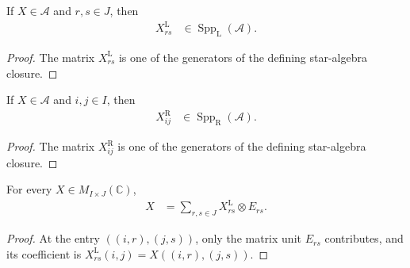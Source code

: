 \begin{lemma}
    \label{thm:qca_left_coefficient_mem_support}
    \leanok
    If $X\in\mathcal A$ and $r,s\in J$, then
    \begin{align}
        X^{\mathrm L}_{rs}
         & \in\operatorname{Spp}_{\mathrm L}(\mathcal A).
    \end{align}
\end{lemma}

\begin{proof}\leanok
    The matrix $X^{\mathrm L}_{rs}$ is one of the generators of the defining
    star-algebra closure.
\end{proof}

\begin{lemma}
    \label{thm:qca_right_coefficient_mem_support}
    \leanok
    If $X\in\mathcal A$ and $i,j\in I$, then
    \begin{align}
        X^{\mathrm R}_{ij}
         & \in\operatorname{Spp}_{\mathrm R}(\mathcal A).
    \end{align}
\end{lemma}

\begin{proof}\leanok
    The matrix $X^{\mathrm R}_{ij}$ is one of the generators of the defining
    star-algebra closure.
\end{proof}

\begin{lemma}
    \label{thm:qca_left_coefficient_reconstruction}
    \leanok
    For every $X\in M_{I\times J}(\mathbb C)$,
    \begin{align}
        X & =\sum_{r,s\in J}X^{\mathrm L}_{rs}\otimes E_{rs}.
    \end{align}
\end{lemma}

\begin{proof}\leanok
    At the entry $((i,r),(j,s))$, only the matrix unit $E_{rs}$ contributes,
    and its coefficient is $X^{\mathrm L}_{rs}(i,j)=X((i,r),(j,s))$.
\end{proof}

